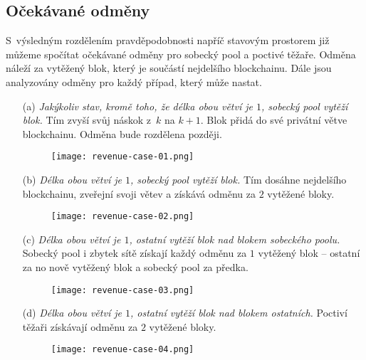 
\subsection{Očekávané odměny}
\label{sec_analyza_odmena}

S~výsledným rozdělením pravděpodobnosti napříč stavovým prostorem již můžeme spočítat očekávané odměny pro sobecký pool a poctivé těžaře. Odměna náleží za vytěžený blok, který je součástí nejdelšího blockchainu. Dále jsou analyzovány odměny pro každý případ, který může nastat.

\begin{enumerate}
    \item[(a)] \textit{Jakýkoliv stav, kromě toho, že délka obou větví je $1$, sobecký pool vytěží blok.} Tím zvyší svůj náskok z~$k$ na $k + 1$. Blok přidá do své privátní větve blockchainu. Odměna bude rozdělena později.

    \begin{figure}[H]
        \centering
        \texttt{[image: revenue-case-01.png]}
    \end{figure}

    \item[(b)] \textit{Délka obou větví je $1$, sobecký pool vytěží blok.} Tím dosáhne nejdelšího blockchainu, zveřejní svoji větev a získává odměnu za $2$ vytěžené bloky.

    \begin{figure}[H]
        \centering
        \texttt{[image: revenue-case-02.png]}
    \end{figure}

    \item[(c)] \textit{Délka obou větví je $1$, ostatní vytěží blok nad blokem sobeckého poolu.} Sobecký pool i zbytek sítě získají každý odměnu za $1$ vytěžený blok -- ostatní za no nově vytěžený blok a sobecký pool za předka.

    \begin{figure}[H]
        \centering
        \texttt{[image: revenue-case-03.png]}
    \end{figure}

    \item[(d)] \textit{Délka obou větví je $1$, ostatní vytěží blok nad blokem ostatních.} Poctiví těžaři získávají odměnu za $2$ vytěžené bloky.

    \begin{figure}[H]
        \centering
        \texttt{[image: revenue-case-04.png]}
    \end{figure}


\end{enumerate}
